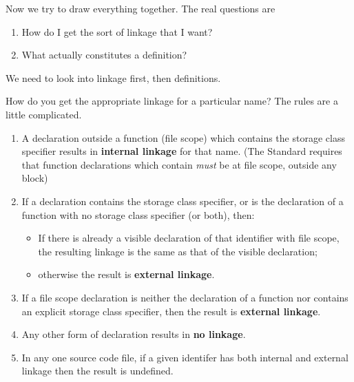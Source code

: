    Now we try to draw everything together. The real questions are


   \begin{enumerate}
    \item How do I get the sort of linkage that I want?
    \item What actually constitutes a definition?
   \end{enumerate}

   We need to look into linkage first, then definitions.


   How do you get the appropriate linkage for a particular name? The
    rules are a little complicated.


   \begin{enumerate}
    \item A declaration outside a function (file scope) which contains the
     \static{} storage class specifier results in \textbf{internal linkage}
     for that name. (The Standard requires that function declarations which
     contain \static{} \textit{must} be at file scope, outside any
     block)

    \item If a declaration contains the \extern{} storage class
     specifier, or is the declaration of a function with no storage class
     specifier (or both), then:

     \begin{itemize}
      \item If there is already a visible declaration of that identifier
       with file scope, the resulting linkage is the same as that of
       the visible declaration;

      \item otherwise the result is \textbf{external linkage}.
     \end{itemize}
    

    \item If a file scope declaration is neither the declaration of a
     function nor contains an explicit storage class specifier, then the
     result is \textbf{external linkage}.

    \item Any other form of declaration results in \textbf{no linkage}.

    \item In any one source code file, if a given identifer has both internal
     and external linkage then the result is undefined.
   \end{enumerate}

